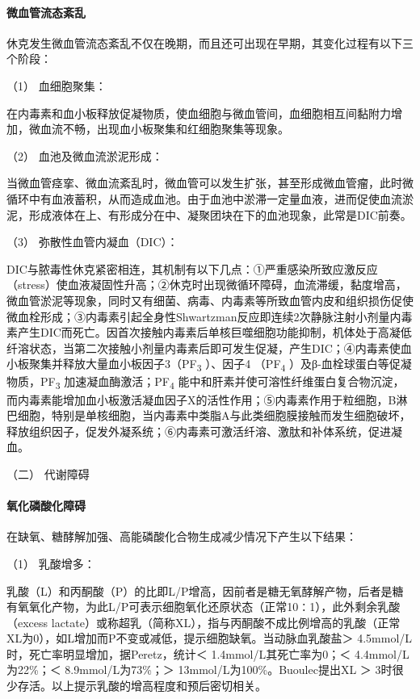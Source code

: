 \paragraph{微血管流态紊乱}

休克发生微血管流态紊乱不仅在晚期，而且还可出现在早期，其变化过程有以下三个阶段：

\hypertarget{text00057.htmlux5cux23CHP2-2-1-3-1-3-1}{}
（1） 血细胞聚集：

在内毒素和血小板释放促凝物质，使血细胞与微血管间，血细胞相互间黏附力增加，微血流不畅，出现血小板聚集和红细胞聚集等现象。

\hypertarget{text00057.htmlux5cux23CHP2-2-1-3-1-3-2}{}
（2） 血池及微血流淤泥形成：

当微血管痉挛、微血流紊乱时，微血管可以发生扩张，甚至形成微血管瘤，此时微循环中有血液蓄积，从而造成血池。由于血池中淤滞一定量血液，进而促使血流淤泥，形成液体在上、有形成分在中、凝聚团块在下的血池现象，此常是DIC前奏。

\hypertarget{text00057.htmlux5cux23CHP2-2-1-3-1-3-3}{}
（3） 弥散性血管内凝血（DIC）：

DIC与脓毒性休克紧密相连，其机制有以下几点：①严重感染所致应激反应（stress）使血液凝固性升高；②休克时出现微循环障碍，血流滞缓，黏度增高，微血管淤泥等现象，同时又有细菌、病毒、内毒素等所致血管内皮和组织损伤促使微血栓形成；③内毒素引起全身性Shwartzman反应即连续2次静脉注射小剂量内毒素产生DIC而死亡。因首次接触内毒素后单核巨噬细胞功能抑制，机体处于高凝低纤溶状态，当第二次接触小剂量内毒素后即可发生促凝，产生DIC；④内毒素使血小板聚集并释放大量血小板因子3（PF\textsubscript{3}
）、因子4 （PF\textsubscript{4}
）及β-血栓球蛋白等促凝物质，PF\textsubscript{3}
加速凝血酶激活；PF\textsubscript{4}
能中和肝素并使可溶性纤维蛋白复合物沉淀，而内毒素能增加血小板激活凝血因子X的活性作用；⑤内毒素作用于粒细胞，B淋巴细胞，特别是单核细胞，当内毒素中类脂A与此类细胞膜接触而发生细胞破坏，释放组织因子，促发外凝系统；⑥内毒素可激活纤溶、激肽和补体系统，促进凝血。

\hypertarget{text00057.htmlux5cux23CHP2-2-1-3-2}{}
（二） 代谢障碍

\paragraph{氧化磷酸化障碍}

在缺氧、糖酵解加强、高能磷酸化合物生成减少情况下产生以下结果：

\hypertarget{text00057.htmlux5cux23CHP2-2-1-3-2-1-1}{}
（1） 乳酸增多：

乳酸（L）和丙酮酸（P）的比即L/P增高，因前者是糖无氧酵解产物，后者是糖有氧氧化产物，为此L/P可表示细胞氧化还原状态（正常10∶1），此外剩余乳酸（excess
lactate）或称超乳（简称XL），指与丙酮酸不成比例增高的乳酸（正常XL为0），如L增加而P不变或减低，提示细胞缺氧。当动脉血乳酸盐＞
4.5mmol/L时，死亡率明显增加，据Peretz，统计＜ 1.4mmol/L其死亡率为0；＜
4.4mmol/L为22\%；＜ 8.9mmol/L为73\%；＞ 13mmol/L为100\%。Buoulec提出XL
＞ 3时很少存活。以上提示乳酸的增高程度和预后密切相关。

